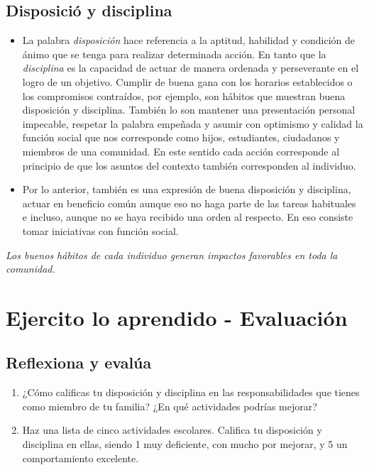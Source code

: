 \documentclass[10pt,twoside]{article}
\begin{document}
\subsection*{Disposici\'{o} y disciplina}
\begin{itemize}
\item La palabra \emph{disposición} hace referencia a la aptitud,
habilidad y condición de ánimo que se tenga para
realizar determinada acción. En tanto que la \emph{disciplina}
es la capacidad de actuar de manera ordenada y
perseverante en el logro de un objetivo. Cumplir
de buena gana con los horarios establecidos o
los compromisos contraídos, por ejemplo, son
hábitos que muestran buena disposición y
disciplina. También lo son mantener una
presentación personal impecable, respetar
la palabra empeñada y asumir con
optimismo y calidad la función social que
nos corresponde como hijos, estudiantes,
ciudadanos y miembros de una comunidad.
En este sentido cada acción corresponde al
principio de que los asuntos del contexto
también corresponden al individuo.
\item Por lo anterior, también es una
expresión de buena disposición
y disciplina, actuar en beneficio
común aunque eso no haga
parte de las tareas habituales
e incluso, aunque no se haya
recibido una orden al respecto.
En eso consiste tomar iniciativas
con función social.
\end{itemize}
\emph{Los buenos hábitos de cada individuo
generan impactos favorables en toda la
comunidad. }
\section*{Ejercito lo aprendido - Evaluaci\'{o}n}
\subsection*{Reflexiona y eval\'{u}a}
 \begin{enumerate}
 \item ¿Cómo calificas tu disposición y disciplina en las
responsabilidades que tienes como miembro de tu familia?
¿En qué actividades podrías mejorar?
\item Haz una lista de cinco actividades escolares. Califica tu
disposición y disciplina en ellas, siendo 1 muy deficiente, con
mucho por mejorar, y 5 un comportamiento excelente.

 \end{enumerate}
\end{document}
